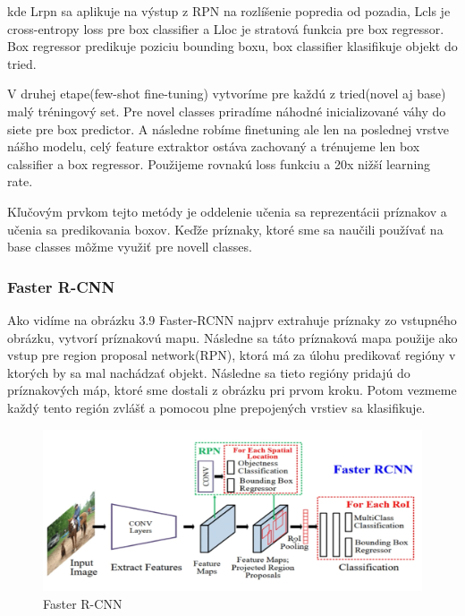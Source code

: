 kde Lrpn sa aplikuje na výstup z RPN na rozlíšenie popredia od pozadia, Lcls je cross-entropy loss pre box classifier a Lloc je stratová funkcia pre box regressor. Box regressor predikuje poziciu bounding boxu, box classifier klasifikuje objekt do tried.

V druhej etape(few-shot fine-tuning) vytvoríme pre každú z tried(novel aj base) malý tréningový set. Pre novel classes priradíme náhodné inicializované váhy do siete pre box predictor. A následne robíme finetuning ale len na poslednej vrstve nášho modelu, celý feature extraktor ostáva zachovaný a trénujeme len box calssifier a box regressor. Použijeme rovnakú loss funkciu a 20x
nižší learning rate.

Kľučovým prvkom tejto metódy je oddelenie učenia sa reprezentácii príznakov a učenia sa
predikovania boxov. Keďže príznaky, ktoré sme sa naučili používať na base classes môžme využiť
pre novell classes.

\subsubsection{Faster R-CNN}

\hspace{\parindent}Ako vidíme na obrázku 3.9 Faster-RCNN najprv extrahuje príznaky zo vstupného obrázku, vytvorí príznakovú mapu. Následne sa táto príznaková mapa použije ako vstup pre region proposal network(RPN), ktorá má za úlohu predikovať regióny v ktorých by sa mal nachádzať objekt. Následne sa tieto regióny pridajú do príznakových máp, ktoré sme dostali z obrázku pri prvom kroku. Potom vezmeme každý tento región zvlášť a pomocou plne prepojených vrstiev sa klasifikuje. 

\begin{figure}[!hbt]
\includegraphics[width=\textwidth]{images/Faster.png}
\caption{Faster R-CNN}
\label{fig:image}
\end{figure}
